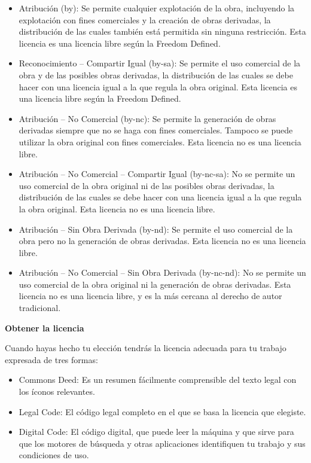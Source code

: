 \begin{itemize}
\item Atribución (by): Se permite cualquier explotación de la obra, incluyendo la explotación con fines comerciales y la creación de obras derivadas, la distribución de las cuales también está permitida sin ninguna restricción. Esta licencia es una licencia libre según la Freedom Defined.
\item Reconocimiento – Compartir Igual (by-sa): Se permite el uso comercial de la obra y de las posibles obras derivadas, la distribución de las cuales se debe hacer con una licencia igual a la que regula la obra original. Esta licencia es una licencia libre según la Freedom Defined.
\item Atribución – No Comercial (by-nc): Se permite la generación de obras derivadas siempre que no se haga con fines comerciales. Tampoco se puede utilizar la obra original con fines comerciales. Esta licencia no es una licencia libre.
\item Atribución – No Comercial – Compartir Igual (by-nc-sa): No se permite un uso comercial de la obra original ni de las posibles obras derivadas, la distribución de las cuales se debe hacer con una licencia igual a la que regula la obra original. Esta licencia no es una licencia libre.
\item Atribución – Sin Obra Derivada (by-nd): Se permite el uso comercial de la obra pero no la generación de obras derivadas. Esta licencia no es una licencia libre.
\item Atribución – No Comercial – Sin Obra Derivada (by-nc-nd): No se permite un uso comercial de la obra original ni la generación de obras derivadas. Esta licencia no es una licencia libre, y es la más cercana al derecho de autor tradicional.
\end{itemize}

{\bf Obtener la licencia}

Cuando hayas hecho tu elección tendrás la licencia adecuada para tu trabajo expresada de tres formas:

\begin{itemize}
\item Commons Deed: Es un resumen fácilmente comprensible del texto legal con los íconos relevantes.
\item Legal Code: El código legal completo en el que se basa la licencia que elegiste.
\item Digital Code: El código digital, que puede leer la máquina y que sirve para que los motores de búsqueda y otras aplicaciones identifiquen tu trabajo y sus condiciones de uso.
\end{itemize}

